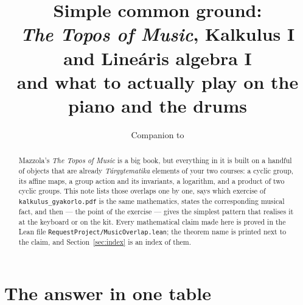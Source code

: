 \documentclass[11pt,a4paper]{article}
\title{\bf Simple common ground:\\
\emph{The Topos of Music}, Kalkulus I and Lineáris algebra I\\[2mm]
\large and what to actually play on the piano and the drums}
\author{Companion to \lean{RequestProject/MusicOverlap.lean}}
\date{}
\newcommand{\lean}[1]{\texttt{#1}}
\begin{document}
\maketitle

\begin{abstract}
Mazzola's \emph{The Topos of Music} is a big book, but everything in it is built
on a handful of objects that are already \emph{Tárgytematika} elements of your
two courses: a cyclic group, its affine maps, a group action and its invariants,
a logarithm, and a product of two cyclic groups. This note lists those overlaps
one by one, says which exercise of \lean{kalkulus\_gyakorlo.pdf} is the same
mathematics, states the corresponding musical fact, and then --- the point of
the exercise --- gives the simplest pattern that realises it at the keyboard or
on the kit. Every mathematical claim made here is proved in the Lean file
\lean{RequestProject/MusicOverlap.lean}; the theorem name is printed next to the
claim, and Section~\ref{sec:index} is an index of them.
\end{abstract}

\section*{The answer in one table}
\end{document}
